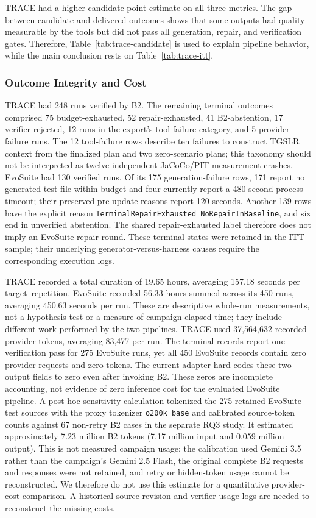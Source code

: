 \documentclass[pdflatex,sn-basic,Numbered,iicol]{sn-jnl}
\begin{document}
TRACE had a higher candidate point estimate on all three metrics. The gap between candidate and delivered outcomes shows that some outputs had quality measurable by the tools but did not pass all generation, repair, and verification gates. Therefore, Table~\ref{tab:trace-candidate} is used to explain pipeline behavior, while the main conclusion rests on Table~\ref{tab:trace-itt}.

\subsubsection{Outcome Integrity and Cost}\label{subsubsec:trace-integrity}

TRACE had 248 runs verified by B2. The remaining terminal outcomes comprised 75 budget-exhausted, 52 repair-exhausted, 41 B2-abstention, 17 verifier-rejected, 12 runs in the export's tool-failure category, and 5 provider-failure runs. The 12 tool-failure rows describe ten failures to construct TGSLR context from the finalized plan and two zero-scenario plans; this taxonomy should not be interpreted as twelve independent JaCoCo/PIT measurement crashes. EvoSuite had 130 verified runs. Of its 175 generation-failure rows, 171 report no generated test file within budget and four currently report a 480-second process timeout; their preserved pre-update reasons report 120 seconds. Another 139 rows have the explicit reason \nolinkurl{TerminalRepairExhausted_NoRepairInBaseline}, and six end in unverified abstention. The shared repair-exhausted label therefore does not imply an EvoSuite repair round. These terminal states were retained in the ITT sample; their underlying generator-versus-harness causes require the corresponding execution logs.

TRACE recorded a total duration of 19.65 hours, averaging 157.18 seconds per target--repetition. EvoSuite recorded 56.33 hours summed across its 450 runs, averaging 450.63 seconds per run. These are descriptive whole-run measurements, not a hypothesis test or a measure of campaign elapsed time; they include different work performed by the two pipelines. TRACE used 37,564,632 recorded provider tokens, averaging 83,477 per run. The terminal records report one verification pass for 275 EvoSuite runs, yet all 450 EvoSuite records contain zero provider requests and zero tokens. The current adapter hard-codes these two output fields to zero even after invoking B2. These zeros are incomplete accounting, not evidence of zero inference cost for the evaluated EvoSuite pipeline. A post hoc sensitivity calculation tokenized the 275 retained EvoSuite test sources with the proxy tokenizer \texttt{o200k\_base} and calibrated source-token counts against 67 non-retry B2 cases in the separate RQ3 study. It estimated approximately 7.23 million B2 tokens (7.17 million input and 0.059 million output). This is not measured campaign usage: the calibration used Gemini 3.5 rather than the campaign's Gemini 2.5 Flash, the original complete B2 requests and responses were not retained, and retry or hidden-token usage cannot be reconstructed. We therefore do not use this estimate for a quantitative provider-cost comparison. A historical source revision and verifier-usage logs are needed to reconstruct the missing costs.
\end{document}
